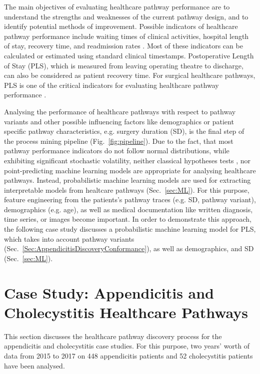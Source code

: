 The main objectives of evaluating healthcare pathway performance are
to understand the strengths and weaknesses of the current pathway design,
and to identify potential methods of improvement. Possible indicators
of healthcare pathway performance include waiting times of clinical
activities, hospital length of stay, recovery time, and readmission
rates \cite{Rotter2008_pathways}.
Most of these indicators can be calculated or estimated using standard clinical timestamps. Postoperative Length of Stay (PLS), which is measured from leaving operating theatre to discharge, can also be considered as patient recovery time.
For surgical healthcare pathways,  PLS is one of the critical indicators for evaluating healthcare pathway
performance \cite{Pearson2001_pathways}. 

Analysing the performance of healthcare pathways with respect to
pathway variants and other possible influencing factors like
demographics or patient specific pathway characteristics, e.g. surgery duration (SD), is the final step of the process mining pipeline
(Fig.~\ref{fig:pipeline}).
Due to the fact, that most pathway performance indicators do not
follow normal distributions, while exhibiting significant stochastic
volatility, neither classical hypotheses tests \cite{Goodman2008_p-value}, nor point-predicting
machine learning models are appropriate for analysing healthcare
pathways.
Instead, probabilistic machine learning models
\cite{Ghahramani2015_PML} are used for extracting interpretable models
from healtcare pathways (Sec.~\ref{sec:ML}).
For this purpose, feature engineering \cite{DongLiu2018_FE} from
the patients's pathway traces (e.g. SD, pathway variant),
demographics (e.g. age), as well as medical documentation like written
diagnosis, time series, or images become important.
In order to demonstrate this approach, the following case study
discusses a probabilistic machine learning model for PLS, which
takes into account pathway variants
(Sec.~\ref{Sec:AppendicitisDiscoveryConformance}), as well as demographics, and
SD (Sec.~\ref{sec:ML}).

\section{Case Study: Appendicitis and Cholecystitis Healthcare Pathways}
This section discusses the healthcare pathway discovery process for the appendicitis and cholecystitis case studies. For this purpose, two years’ worth of data
from 2015 to 2017 on 448 appendicitis patients and 52 cholecystitis patients have been analysed. 

